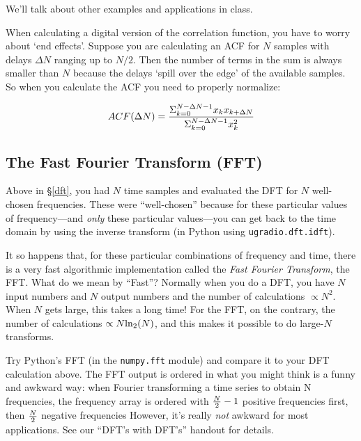 \documentclass[12pt,preprint]{aastex}
\begin{document}
We'll talk about other examples and applications in class.

When calculating a digital version of the correlation function, you have
to worry about `end effects'. Suppose you are calculating an ACF for $N$
samples with delays $\Delta N$ ranging up to $N/2$. Then the number of
terms in the sum is always smaller than $N$ because the delays `spill
over the edge' of the available samples. So when you calculate the ACF
you need to properly normalize:

\begin{equation}
ACF(\Delta N) = { \Sigma_{k=0}^{ N-\Delta N-1} x_k x_{k+\Delta N} \over
                  \Sigma_{k=0}^{ N-\Delta N-1} x_k^2}
\end{equation}

\subsection{The Fast Fourier Transform (FFT)} \label{fft}

Above in \S \ref{dft}, you had $N$ time samples and evaluated the DFT
for $N$ well-chosen frequencies. These were ``well-chosen'' because for
these particular values of frequency---and {\it only} these particular
values---you can get back to the time domain by using the inverse
transform (in Python using {\tt ugradio.dft.idft}).

It so happens that, for these particular combinations of frequency and
time, there is a very fast algorithmic implementation called the {\it
  Fast Fourier Transform}, the FFT. What do we mean by ``Fast''? 
Normally when you do a DFT, you have $N$ input numbers and $N$ output
numbers and the number of calculations $\propto N^2$. When $N$ gets
large, this takes a long time!  For the FFT, on the
contrary, the number of calculations $\propto N {\rm ln}_2(N)$, and this
makes it possible to do large-$N$ transforms.

Try Python's FFT (in the {\tt numpy.fft} module) and compare it to your DFT calculation above. The FFT
output is ordered in what you might think is a funny and awkward way:
when Fourier transforming a time series to obtain N frequencies, the
frequency array is ordered with ${N \over 2} - 1$ positive frequencies
first, then $N \over 2$ negative frequencies 
However, it's really {\it not} awkward for most
    applications. See our ``DFT's with DFT's'' handout for details.
\end{document}
